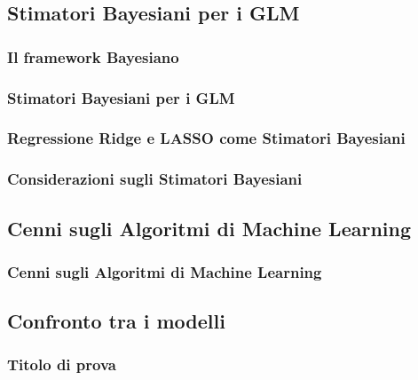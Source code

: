 \documentclass[pdf, aspectratio=169]{beamer}\usepackage[]{graphicx}\usepackage[]{color}
\theoremstyle{definition}
\begin{document}
\subsection{Stimatori Bayesiani per i GLM}

\begin{frame}
\frametitle{Il framework Bayesiano}

\end{frame}


\begin{frame}
\frametitle{Stimatori Bayesiani per i GLM}

\end{frame}


\begin{frame}
\frametitle{Regressione Ridge e LASSO come Stimatori Bayesiani}

\end{frame}


\begin{frame}
\frametitle{Considerazioni sugli Stimatori Bayesiani}

\end{frame}


\subsection{Cenni sugli Algoritmi di Machine Learning}

\begin{frame}
\frametitle{Cenni sugli Algoritmi di Machine Learning}

\end{frame}


\subsection{Confronto tra i modelli}

\begin{frame}
\frametitle{Titolo di prova}

\end{frame}
\end{document}

